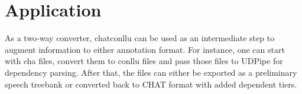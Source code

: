 \chapter{Application} %

\label{Chapter6} %

As a two-way converter, chatconllu can be used as an intermediate step to augment information to either annotation format. For instance, one can start with cha files, convert them to conllu files and pass those files to UDPipe for dependency parsing. After that, the files can either be exported as a preliminary speech treebank or converted back to CHAT format with added dependent tiers.
